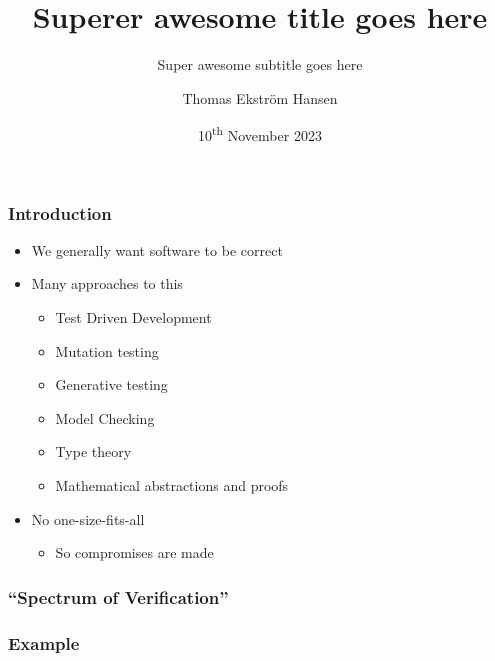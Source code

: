 \documentclass[compress]{beamer}
\title{Superer awesome title goes here}
\subtitle{Super awesome subtitle goes here}
\author{Thomas Ekstr{\" o}m Hansen}
\date{10\textsuperscript{th} November 2023}
\begin{document}
\maketitle

\begin{frame}
  \frametitle{Introduction}

  \begin{itemize}
    \item We generally want software to be correct
    \item Many approaches to this
      \begin{itemize}
        \item Test Driven Development
        \item Mutation testing
        \item Generative testing
        \item Model Checking
        \item Type theory
        \item Mathematical abstractions and proofs
      \end{itemize}
    \item No one-size-fits-all
      \begin{itemize}
        \item So compromises are made
      \end{itemize}
  \end{itemize}

\end{frame}

\begin{frame}
  \frametitle{``Spectrum of Verification''}


\end{frame}

\begin{frame}
  \frametitle{Example}

\end{frame}
\end{document}

